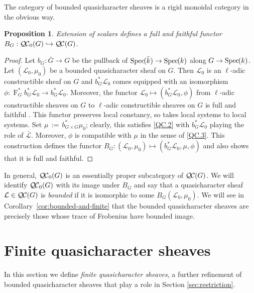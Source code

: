 \documentclass{amsart}
\theoremstyle{plain}
\newtheorem{proposition}[theorem]{Proposition}
\theoremstyle{definition}
\theoremstyle{remark}
\newcommand{\bFq}{\bar{k}}
\newcommand{\Fq}{k}
\newcommand{\Frob}[1]{\operatorname{F}_{#1}}
\newcommand{\Spec}[1]{{\operatorname{Spec}\hskip-1pt( #1 )}}
\newcommand{\ceq}{{\, :=\, }}
\newcommand{\qcs}[1]{{\mathcal{#1}}}
\newcommand{\gqcs}[1]{{\mathcal{\bar #1}}}
\newcommand{\QC}{{\mathcal{Q\hskip-0.8pt C}}}
\newcommand{\QCb}{{\QC_0}}
\begin{document}
The category of bounded quasicharacter sheaves is a rigid monoidal category in the obvious way. 

\begin{proposition}\label{prop:BG}
Extension of scalars defines a full and faithful functor 
$B_G : \QCb(G) \hookrightarrow \QC(G)$.
\end{proposition}

\begin{proof}
 Let $b_G : {\bar G} \to G$ be the pullback of $\Spec{\bFq} \to \Spec{\Fq}$ along $G\to \Spec{\Fq}$.
 Let $(\qcs{L}_0,\mu_0)$ be a bounded quasicharacter sheaf on $G$. 
 Then $\qcs{L}_0$ is an $\ell$-adic constructible sheaf on $G$ and
 $b_G^* \qcs{L}_0$ comes equipped with an isomorphism 
 $\phi : \Frob{G}^* b_G^*\qcs{L}_0 \to b_G^* \qcs{L}_0$.
 Moreover, the functor $\qcs{L}_0 \mapsto (b_G^* \qcs{L}_0,\phi)$  
 from $\ell$-adic constructible sheaves on $G$ to $\ell$-adic constructible sheaves on $G$
 is full and faithful . 
 This functor preserves local constancy, so takes local systems to local systems. 
 Set $\mu \ceq b_{G\times G}^*\mu_0$; clearly, this satisfies \ref{QC.2} 
 with $b_G^*\qcs{L}_0$ playing the role of $\gqcs{L}$.
 Moreover, $\phi$ is compatible with $\mu$ in the sense of \ref{QC.3}.
 This construction defines the functor $B_G : (\qcs{L}_0,\mu_0) \mapsto (b_G^*\qcs{L}_0,\mu, \phi)$
 and also shows that it is full and faithful.
\end{proof}

In general, $\QCb(G)$ is an essentially
proper subcategory of $\QC(G)$. We will identify $\QCb(G)$ with its image under $B_G$
and say that a quasicharacter sheaf $\qcs{L} \in \QC(G)$ is \emph{bounded}
if it is isomorphic to some $B_G(\qcs{L}_0, \mu_0)$.
We will see in Corollary~\ref{cor:bounded-and-finite} that the bounded quasicharacter sheaves
are precisely those whose trace of Frobenius have bounded image.

\section{Finite quasicharacter sheaves}\label{sec:finite}
 
In this section we define \emph{finite quasicharacter sheaves}, a further refinement
of bounded quasicharacter sheaves that play a role in Section \ref{sec:restriction}.
\end{document}
